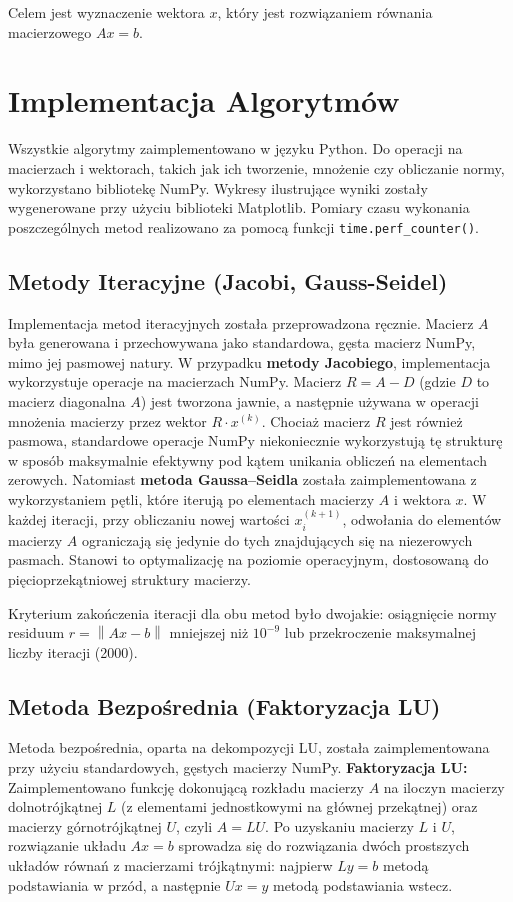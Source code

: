 \documentclass[a4paper, 11pt]{article}
\newcommand{\norm}[1]{\left\lVert#1\right\rVert}
\begin{document}
Celem jest wyznaczenie wektora $x$, który jest rozwiązaniem równania macierzowego $Ax = b$.

\section{Implementacja Algorytmów}
Wszystkie algorytmy zaimplementowano w języku Python. Do operacji na macierzach i wektorach, takich jak ich tworzenie, mnożenie czy obliczanie normy, wykorzystano bibliotekę NumPy. Wykresy ilustrujące wyniki zostały wygenerowane przy użyciu biblioteki Matplotlib. Pomiary czasu wykonania poszczególnych metod realizowano za pomocą funkcji \texttt{time.perf\_counter()}.

\subsection{Metody Iteracyjne (Jacobi, Gauss-Seidel)}
Implementacja metod iteracyjnych została przeprowadzona ręcznie. Macierz $A$ była generowana i przechowywana jako standardowa, gęsta macierz NumPy, mimo jej pasmowej natury.
W przypadku \textbf{metody Jacobiego}, implementacja wykorzystuje operacje na macierzach NumPy. Macierz $R = A - D$ (gdzie $D$ to macierz diagonalna $A$) jest tworzona jawnie, a następnie używana w operacji mnożenia macierzy przez wektor $R \cdot x^{(k)}$. Chociaż macierz $R$ jest również pasmowa, standardowe operacje NumPy niekoniecznie wykorzystują tę strukturę w sposób maksymalnie efektywny pod kątem unikania obliczeń na elementach zerowych.
Natomiast \textbf{metoda Gaussa–Seidla} została zaimplementowana z wykorzystaniem pętli, które iterują po elementach macierzy $A$ i wektora $x$. W każdej iteracji, przy obliczaniu nowej wartości $x_i^{(k+1)}$, odwołania do elementów macierzy $A$ ograniczają się jedynie do tych znajdujących się na niezerowych pasmach. Stanowi to optymalizację na poziomie operacyjnym, dostosowaną do pięcioprzekątniowej struktury macierzy.

Kryterium zakończenia iteracji dla obu metod było dwojakie: osiągnięcie normy residuum $r = \norm{Ax - b}$ mniejszej niż $10^{-9}$ lub przekroczenie maksymalnej liczby iteracji (2000).

\subsection{Metoda Bezpośrednia (Faktoryzacja LU)}
Metoda bezpośrednia, oparta na dekompozycji LU, została zaimplementowana przy użyciu standardowych, gęstych macierzy NumPy.
\textbf{Faktoryzacja LU:} Zaimplementowano funkcję dokonującą rozkładu macierzy $A$ na iloczyn macierzy dolnotrójkątnej $L$ (z elementami jednostkowymi na głównej przekątnej) oraz macierzy górnotrójkątnej $U$, czyli $A = LU$.
Po uzyskaniu macierzy $L$ i $U$, rozwiązanie układu $Ax=b$ sprowadza się do rozwiązania dwóch prostszych układów równań z macierzami trójkątnymi: najpierw $Ly=b$ metodą podstawiania w przód, a następnie $Ux=y$ metodą podstawiania wstecz.
\end{document}
